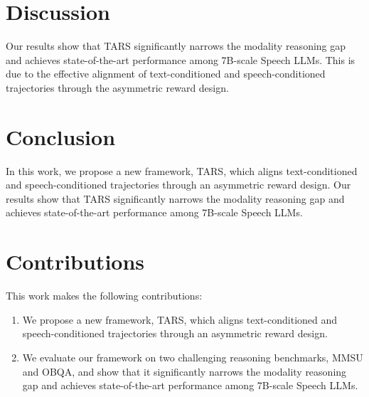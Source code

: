 \documentclass[12pt, a4paper]{article}
\begin{document}
\section{Discussion}

Our results show that TARS significantly narrows the modality reasoning gap and achieves state-of-the-art performance among 7B-scale Speech LLMs. This is due to the effective alignment of text-conditioned and speech-conditioned trajectories through the asymmetric reward design.

\section{Conclusion}

In this work, we propose a new framework, TARS, which aligns text-conditioned and speech-conditioned trajectories through an asymmetric reward design. Our results show that TARS significantly narrows the modality reasoning gap and achieves state-of-the-art performance among 7B-scale Speech LLMs.

\section{Contributions}

This work makes the following contributions:

\begin{enumerate}
\item We propose a new framework, TARS, which aligns text-conditioned and speech-conditioned trajectories through an asymmetric reward design.
\item We evaluate our framework on two challenging reasoning benchmarks, MMSU and OBQA, and show that it significantly narrows the modality reasoning gap and achieves state-of-the-art performance among 7B-scale Speech LLMs.
\end{enumerate}
\end{document}
